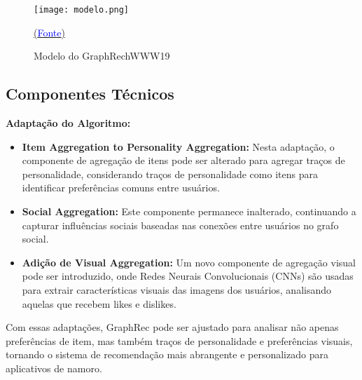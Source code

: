 \clearpage
\begin{figure}
    \centering
    \vspace{-2cm}
    \hspace*{-2.5cm} %
    \texttt{[image: modelo.png]}
    \caption{Modelo do GraphRechWWW19} \protect\href{https://github.com/wenqifan03/GraphRec-WWW19}{(\textcolor{blue}{Fonte})}
    \label{fig:cnn}
\end{figure}

\subsection{Componentes Técnicos}

\textbf{Adaptação do Algoritmo:}

\begin{itemize}
    \item \textbf{Item Aggregation to Personality Aggregation:}  
    Nesta adaptação, o componente de agregação de itens pode ser alterado para agregar traços de personalidade, considerando traços de personalidade como itens para identificar preferências comuns entre usuários.

    \item \textbf{Social Aggregation:}  
    Este componente permanece inalterado, continuando a capturar influências sociais baseadas nas conexões entre usuários no grafo social.

    \item \textbf{Adição de Visual Aggregation:}  
    Um novo componente de agregação visual pode ser introduzido, onde Redes Neurais Convolucionais (CNNs) são usadas para extrair características visuais das imagens dos usuários, analisando aquelas que recebem likes e dislikes.
\end{itemize}

Com essas adaptações, GraphRec pode ser ajustado para analisar não apenas preferências de item, mas também traços de personalidade e preferências visuais, tornando o sistema de recomendação mais abrangente e personalizado para aplicativos de namoro.



